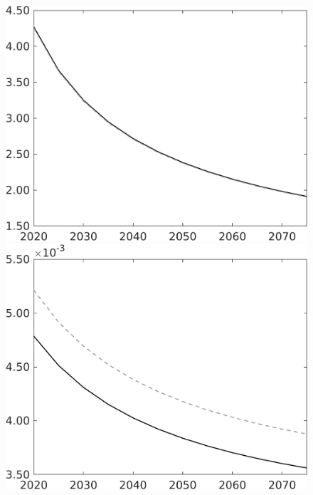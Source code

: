 \documentclass[12pt]{article}
\begin{document}
\begin{figure}[h!!]
\begin{minipage}[]{0.32\textwidth}
	\end{minipage}	
	\begin{minipage}[]{0.32\textwidth}
		\includegraphics[width=1\textwidth]{../../codding_model/own_basedOnFried/optimalPol_010922_revision/figures/all_13Sept22/CompTaul_Equlab_LFBAU_Reg0_pgpftf_spillover0_nsk0_xgr0_knspil0_sep1_countec0_GovRev0_etaa0.79_lgd0.png}
	\end{minipage}	
	\begin{minipage}[]{0.32\textwidth}
		\includegraphics[width=1\textwidth]{../../codding_model/own_basedOnFried/optimalPol_010922_revision/figures/all_13Sept22/CompTaul_Equlab_LFBAU_Reg0_Lf_spillover0_nsk0_xgr0_knspil0_sep1_countec0_GovRev0_etaa0.79_lgd0.png}

\end{minipage}
\end{figure}
\end{document}
